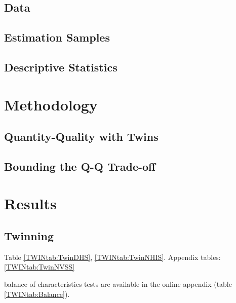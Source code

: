 \documentclass[subeqn]{article}
\begin{document}
\begin{spacing}{1.4}
\subsection{Data}                                  \label{TWINsscn:data}
\subsection{Estimation Samples}                    \label{TWINsscn:samples}
\subsection{Descriptive Statistics}                \label{TWINsscn:descriptives}
\section{Methodology}                              \label{TWINscn:method}
\subsection{Quantity-Quality with Twins}           \label{TWINsscn:methodQQ}
\subsection{Bounding the Q-Q Trade-off}            \label{TWINsscn:methodBounds}
\section{Results}                                  \label{TWINscn:results}
\subsection{Twinning}                              \label{TWINsscn:twinning}
Table \ref{TWINtab:TwinDHS}, \ref{TWINtab:TwinNHIS}.
Appendix tables: \ref{TWINtab:TwinNVSS}

balance of characteristics tests are available in the online appendix (table 
\ref{TWINtab:Balance}).





\end{spacing}
\end{document}
